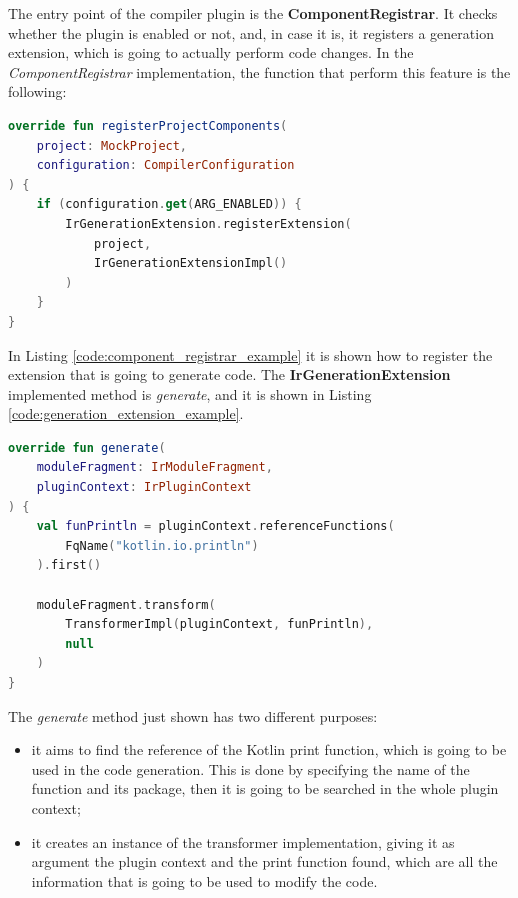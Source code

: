 The entry point of the compiler plugin is the \textbf{ComponentRegistrar}. It checks whether the plugin is enabled or not, and, in case it is, it registers a generation extension, which is going to actually perform code changes. In the \textit{ComponentRegistrar} implementation, the function that perform this feature is the following:
\begin{lstlisting}[caption={Example of registration of extension if the plugin is enabled performed by the \textit{ComponentRegistrar}}, captionpos=b, language=Kotlin, label={code:component_registrar_example}]
override fun registerProjectComponents(
    project: MockProject,
    configuration: CompilerConfiguration
) {
    if (configuration.get(ARG_ENABLED)) {
        IrGenerationExtension.registerExtension(
            project,
            IrGenerationExtensionImpl()
        )
    }
}
\end{lstlisting}
In Listing \ref{code:component_registrar_example} it is shown how to register the extension that is going to generate code. The \textbf{IrGenerationExtension} implemented method is \textit{generate}, and it is shown in Listing \ref{code:generation_extension_example}.
\begin{lstlisting}[caption={Example of \textit{IrGenerationExtension} implementation of methos generate}, captionpos=b, language=Kotlin, label={code:generation_extension_example}]
override fun generate(
    moduleFragment: IrModuleFragment,
    pluginContext: IrPluginContext
) {
    val funPrintln = pluginContext.referenceFunctions(
        FqName("kotlin.io.println")
    ).first()

    moduleFragment.transform(
        TransformerImpl(pluginContext, funPrintln),
        null
    )
}
\end{lstlisting}
The \textit{generate} method just shown has two different purposes:
\begin{itemize}
    \item it aims to find the reference of the Kotlin print function, which is going to be used in the code generation. This is done by specifying the name of the function and its package, then it is going to be searched in the whole plugin context;
    \item it creates an instance of the transformer implementation, giving it as argument the plugin context and the print function found, which are all the information that is going to be used to modify the code.
\end{itemize}


